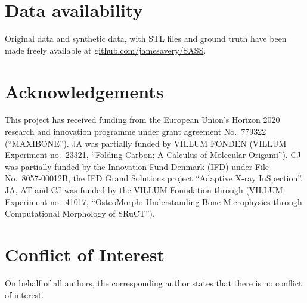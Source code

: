 \section{Data availability}

Original data and synthetic data, with STL files and ground truth have been
made freely available at
\href{https://github.com/jamesavery/SASS}{github.com/jamesavery/SASS}.

\section{Acknowledgements}

This project has received funding from the European Union’s Horizon 2020
research and innovation programme under grant agreement No.~779322
(``MAXIBONE'').  JA was partially funded by VILLUM FONDEN (VILLUM Experiment
no.~23321, “Folding Carbon: A Calculus of Molecular Origami”).  CJ was partially
funded by the Innovation Fund Denmark (IFD) under File No.~8057-00012B, the IFD
Grand Solutions project ``Adaptive X-ray InSpection''.  JA, AT and CJ was funded
by the VILLUM Foundation through (VILLUM Experiment no.~41017, “OsteoMorph:
Understanding Bone Microphysics through Computational Morphology of SRuCT”).

\section{Conflict of Interest}
On behalf of all authors, the corresponding author states that there is no
conflict of interest.

